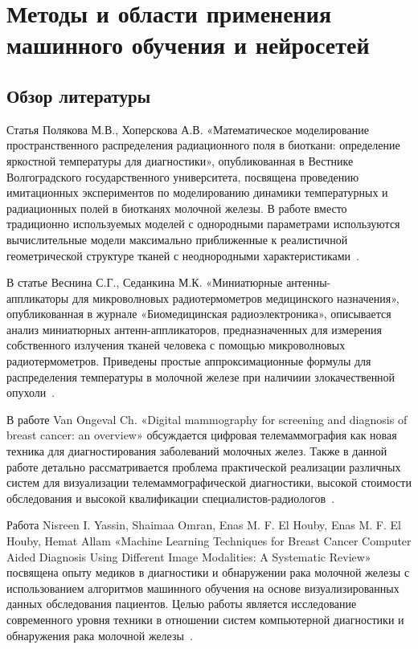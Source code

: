 \chapter{Методы и области применения машинного обучения и нейросетей}

\section{Обзор литературы}
Статья Полякова М.В., Хоперскова А.В. «Математическое моделирование пространственного распределения радиационного поля в биоткани: определение яркостной температуры для диагностики», опубликованная в Вестнике Волгоградского государственного университета, посвящена проведению имитационных экспериментов по моделированию динамики температурных и радиационных полей в биотканях молочной железы. В работе вместо традиционно используемых моделей с однородными параметрами используются вычислительные модели максимально приближенные к реалистичной геометрической структуре тканей с неоднородными характеристиками~\cite{polyakovKhoperskov}.


В статье Веснина С.Г., Седанкина М.К. «Миниатюрные антенны-\\аппликаторы для микроволновых радиотермометров медицинского назначения», опубликованная в журнале «Биомедицинская радиоэлектроника», описывается анализ миниатюрных антенн-аппликаторов, предназначенных для измерения собственного излучения тканей человека с помощью микроволновых радиотермометров. Приведены простые аппроксимационные формулы для распределения температуры в молочной железе при наличиии злокачественной опухоли~\cite{vesninMinAntenn}.


В работе Van Ongeval Ch. «Digital mammography for screening and diagnosis of breast cancer: an overview» обсуждается цифровая телемаммография как новая техника для диагностирования заболеваний молочных желез. Также в данной работе детально рассматривается проблема практической реализации различных систем для визуализации телемаммографической диагностики, высокой стоимости обследования и высокой квалификации специалистов-радиологов~\cite{vanOngeval}.


Работа Nisreen I. Yassin, Shaimaa Omran, Enas M. F. El Houby, Enas M. F. El Houby, Hemat Allam «Machine Learning Techniques for Breast Cancer Computer Aided Diagnosis Using Different Image Modalities: A Systematic Review» посвящена опыту медиков в диагностики и обнаружении рака молочной железы с использованием алгоритмов машинного обучения на основе визуализированных данных обследования пациентов. Целью работы является исследование современного уровня техники в отношении систем компьютерной диагностики и обнаружения рака молочной железы~\cite{nisrenml}.


